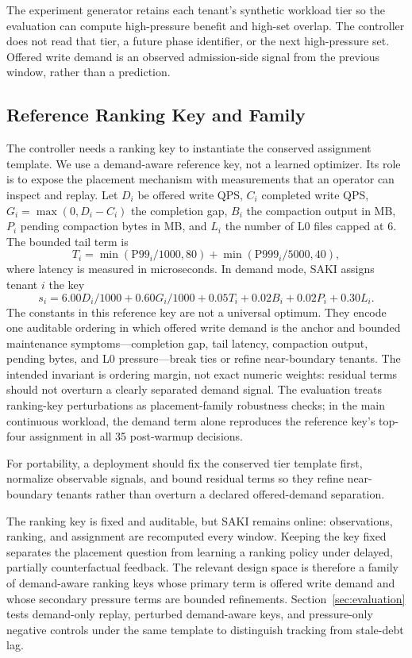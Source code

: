 The experiment generator retains each tenant's synthetic workload tier so the
evaluation can compute high-pressure benefit and high-set overlap. The
controller does not read that tier, a future phase identifier, or the next
high-pressure set. Offered write demand is an observed admission-side signal
from the previous window, rather than a prediction.

\subsection{Reference Ranking Key and Family}

The controller needs a ranking key to instantiate the conserved assignment
template. We use a demand-aware reference key, not a learned optimizer. Its role
is to expose the placement mechanism with measurements that an operator can
inspect and replay. Let \(D_i\) be offered write QPS, \(C_i\) completed write
QPS, \(G_i=\max(0,D_i-C_i)\) the completion gap, \(B_i\) the compaction output
in MB, \(P_i\) pending compaction bytes in MB, and \(L_i\) the number of L0
files capped at 6. The bounded tail term is
\[
T_i=\min(\mathrm{P99}_i/1000,80)+\min(\mathrm{P999}_i/5000,40),
\]
where latency is measured in microseconds. In demand mode, SAKI assigns tenant
\(i\) the key
\[
s_i =
6.00 D_i/1000
+0.60 G_i/1000
+0.05 T_i
+0.02 B_i
+0.02 P_i
+0.30 L_i .
\]
The constants in this reference key are not a universal optimum. They encode one
auditable ordering in which offered write demand is the anchor and bounded
maintenance symptoms---completion gap, tail latency, compaction output,
pending bytes, and L0 pressure---break ties or refine near-boundary tenants.
The intended invariant is ordering margin, not exact numeric weights:
residual terms should not overturn a clearly separated demand signal. The
evaluation treats ranking-key perturbations as placement-family robustness
checks; in the main continuous workload, the demand term alone reproduces the
reference key's top-four assignment in all 35 post-warmup decisions.

For portability, a deployment should fix the conserved tier template first,
normalize observable signals, and bound residual terms so they refine
near-boundary tenants rather than overturn a declared offered-demand
separation.

The ranking key is fixed and auditable, but SAKI remains online: observations,
ranking, and assignment are recomputed every window. Keeping the key fixed
separates the placement question from learning a ranking policy under delayed,
partially counterfactual feedback. The relevant design space is therefore a
family of demand-aware ranking keys whose primary term is offered write demand
and whose secondary pressure terms are bounded refinements. Section~\ref{sec:evaluation}
tests demand-only replay, perturbed demand-aware keys, and pressure-only
negative controls under the same template to distinguish tracking from
stale-debt lag.


